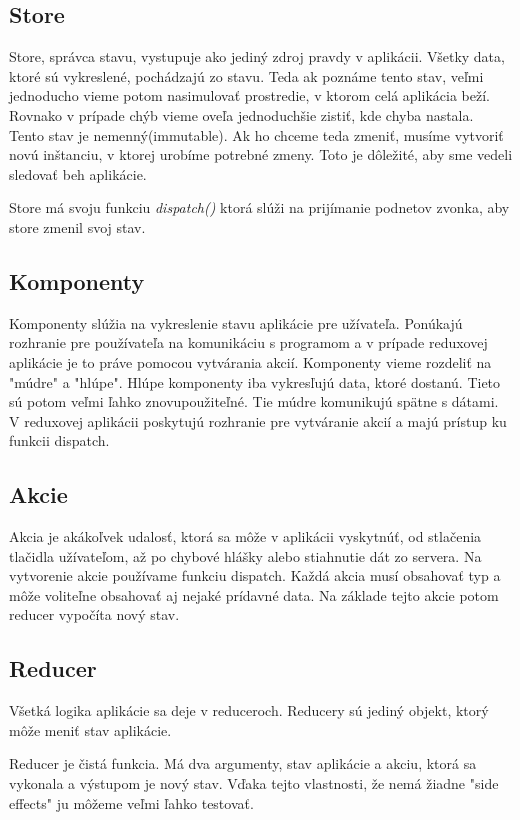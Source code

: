 \subsection{Store}
Store, správca stavu, vystupuje ako jediný zdroj pravdy v aplikácii. Všetky data, ktoré sú vykreslené, pochádzajú zo stavu. Teda ak poznáme tento stav, veľmi jednoducho vieme potom nasimulovať prostredie, v ktorom celá aplikácia beží. Rovnako v prípade chýb vieme oveľa jednoduchšie zistiť, kde chyba nastala. Tento stav je nemenný(immutable). Ak ho chceme teda zmeniť, musíme vytvoriť novú inštanciu, v ktorej urobíme potrebné zmeny. Toto je dôležité, aby sme vedeli sledovať beh aplikácie.

Store má svoju funkciu \emph{dispatch()} ktorá slúži na prijímanie podnetov zvonka, aby store zmenil svoj stav.

\subsection{Komponenty}%
Komponenty slúžia na vykreslenie stavu aplikácie pre užívateľa. Ponúkajú rozhranie pre používateľa na komunikáciu s programom a v prípade reduxovej aplikácie je to práve pomocou vytvárania akcií. Komponenty vieme rozdeliť na "múdre" a "hlúpe".%
Hlúpe komponenty iba vykresľujú data, ktoré dostanú. Tieto sú potom veľmi ľahko znovupoužiteľné. Tie múdre komunikujú spätne s dátami. V reduxovej aplikácii poskytujú rozhranie pre vytváranie akcií a majú prístup ku funkcii dispatch.

\subsection{Akcie}
Akcia je akákoľvek udalosť, ktorá sa môže v aplikácii vyskytnúť, od stlačenia tlačidla užívateľom, až po chybové hlášky alebo stiahnutie dát zo servera. Na vytvorenie akcie používame funkciu dispatch. Každá akcia musí obsahovať typ a môže voliteľne obsahovať aj nejaké prídavné data. Na základe tejto akcie potom reducer vypočíta nový stav.

\subsection{Reducer}%
Všetká logika aplikácie sa deje v reduceroch. Reducery sú jediný objekt, ktorý môže meniť stav aplikácie.

Reducer je čistá funkcia. Má dva argumenty, stav aplikácie a akciu, ktorá sa vykonala a výstupom je nový stav. Vďaka tejto vlastnosti, že nemá žiadne "side effects" ju môžeme veľmi ľahko testovať.


